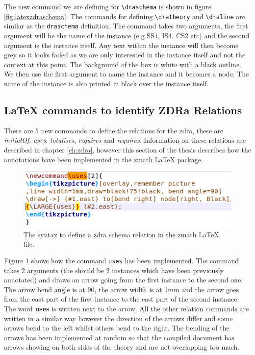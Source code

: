 The new command we are defining for \verb|\draschema| is shown in figure
\ref{fig:latexzdraschema}. The commands for defining \verb|\dratheory| and
\verb|\draline| are similar as the \verb|draschema| definition. The command
takes two arguments, the first argument will be the name of the instance (e.g
SS1, IS4, CS2 etc) and the second argument is the instance itself. Any text
within the instance will then become grey so it looks faded as we are only
interested in the instance itself and not the context at this point. The
background of the box is white with a black outline. We then use the first
argument to name the instance and it becomes a node. The name of the instance is
also printed in black over the instance itself.

\subsection{\LaTeX{} commands to identify ZDRa Relations}

There are 5 new commands to define the relations for the \gls{zdra}, these are
\emph{initialOf}, \emph{uses}, \emph{totalises}, \emph{requires} and
\emph{requires}. Information on these relations are described in chapter
\ref{ch:zdra}, however this section of the thesis describes how the annotations
have been implemented in the \gls{zmath} \LaTeX{} package.

\begin{figure}[H]
\includegraphics[scale=0.7]{Figures/Design/zmathd.png}
\caption{The syntax to define a \gls{zdra} schema relation in the \gls{zmath} \LaTeX{} file. \label{fig:latexzdrauses}}
\end{figure}

Figure \ref{fig:latexzdrauses} shows how the command \verb|uses| has been
implemented. The command takes 2 arguments (the should be 2 instances which have
been previously annotated) and draws an arrow going from the first instance to
the second one. The arrow bend angle is at 90, the arrow width is at 1mm and the
arrow goes from the east part of the first instance to the east part of the
second instance. The word \textbf{uses} is written next to the arrow. All the
other relation commands are written in a similar way however the direction of
the arrows differ and some arrows bend to the left whilst others bend to the
right. The bending of the arrows has been implemented at random so that the
compiled document has arrows showing on both sides of the theory and are not
overlapping too much.

